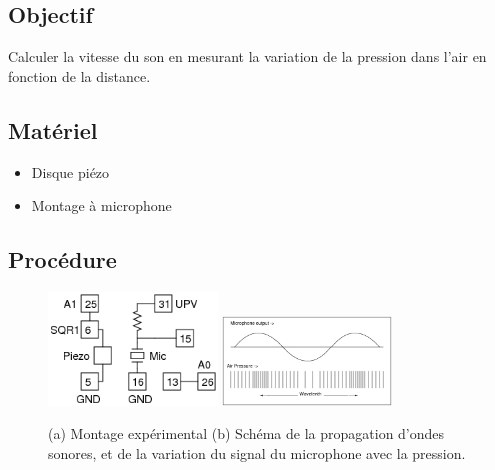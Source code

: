 \documentclass{book}
\begin{document}
\subsection{Objectif}


Calculer la vitesse du son en mesurant la variation de la pression dans l'air en fonction de la distance.




\subsection{Matériel}


\begin{itemize}
  \item Disque piézo
  \item Montage à microphone
\end{itemize}

\subsection{Procédure}


\begin{figure}[h!]
\begin{center}
\caption{\label{fig:Sound-waves}(a) Montage expérimental (b) Schéma de la propagation d'ondes sonores, et de la variation du signal du microphone avec la pression. }\vspace{0.5em}
\includegraphics[width=0.4\textwidth, height=0.3\textwidth, keepaspectratio]{Schematic-sound-vel.png}
\includegraphics[width=0.4\textwidth, height=0.3\textwidth, keepaspectratio]{Pic-sound-waves.png}
\end{center}
\end{figure}
\end{document}
